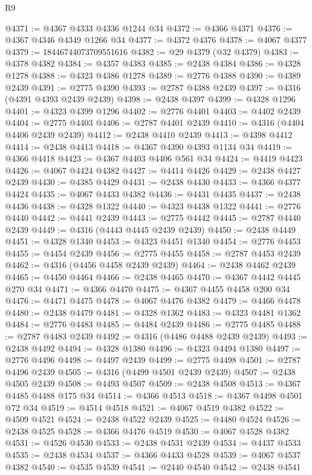 \begin{lexlean}{R9}
\begin{coremodule}
@4371 := @4367 @4333 @4336 @1244 @34
@4372 := @4366 @4371
@4376 := @4367 @4346 @4349 @1266 @34
@4377 := @4372 @4376
@4378 := @4067 @4377
@4379 := 18446744073709551616
@4382 := @29 @4379 (@32 @4379)
@4383 := @4378 @4382
@4384 := @4357 @4383
@4385 := @2438 @4384
@4386 := @4328 @1278
@4388 := @4323 @4386 @1278
@4389 := @2776 @4388
@4390 := @4389 @2439
@4391 := @2775 @4390
@4393 := @2787 @4388 @2439
@4397 := @4316 (@4391 @4393 @2439 @2439)
@4398 := @2438 @4397
@4399 := @4328 @1296
@4401 := @4323 @4399 @1296
@4402 := @2776 @4401
@4403 := @4402 @2439
@4404 := @2775 @4403
@4406 := @2787 @4401 @2439
@4410 := @4316 (@4404 @4406 @2439 @2439)
@4412 := @2438 @4410 @2439
@4413 := @4398 @4412
@4414 := @2438 @4413
@4418 := @4367 @4390 @4393 @1134 @34
@4419 := @4366 @4418
@4423 := @4367 @4403 @4406 @561 @34
@4424 := @4419 @4423
@4426 := @4067 @4424 @4382
@4427 := @4414 @4426
@4429 := @2438 @4427 @2439
@4430 := @4385 @4429
@4431 := @2438 @4430
@4433 := @4366 @4377 @4424
@4435 := @4067 @4433 @4382
@4436 := @4431 @4435
@4437 := @2438 @4436
@4438 := @4328 @1322
@4440 := @4323 @4438 @1322
@4441 := @2776 @4440
@4442 := @4441 @2439
@4443 := @2775 @4442
@4445 := @2787 @4440 @2439
@4449 := @4316 (@4443 @4445 @2439 @2439)
@4450 := @2438 @4449
@4451 := @4328 @1340
@4453 := @4323 @4451 @1340
@4454 := @2776 @4453
@4455 := @4454 @2439
@4456 := @2775 @4455
@4458 := @2787 @4453 @2439
@4462 := @4316 (@4456 @4458 @2439 @2439)
@4464 := @2438 @4462 @2439
@4465 := @4450 @4464
@4466 := @2438 @4465
@4470 := @4367 @4442 @4445 @270 @34
@4471 := @4366 @4470
@4475 := @4367 @4455 @4458 @200 @34
@4476 := @4471 @4475
@4478 := @4067 @4476 @4382
@4479 := @4466 @4478
@4480 := @2438 @4479
@4481 := @4328 @1362
@4483 := @4323 @4481 @1362
@4484 := @2776 @4483
@4485 := @4484 @2439
@4486 := @2775 @4485
@4488 := @2787 @4483 @2439
@4492 := @4316 (@4486 @4488 @2439 @2439)
@4493 := @2438 @4492
@4494 := @4328 @1380
@4496 := @4323 @4494 @1380
@4497 := @2776 @4496
@4498 := @4497 @2439
@4499 := @2775 @4498
@4501 := @2787 @4496 @2439
@4505 := @4316 (@4499 @4501 @2439 @2439)
@4507 := @2438 @4505 @2439
@4508 := @4493 @4507
@4509 := @2438 @4508
@4513 := @4367 @4485 @4488 @175 @34
@4514 := @4366 @4513
@4518 := @4367 @4498 @4501 @72 @34
@4519 := @4514 @4518
@4521 := @4067 @4519 @4382
@4522 := @4509 @4521
@4524 := @2438 @4522 @2439
@4525 := @4480 @4524
@4526 := @2438 @4525
@4528 := @4366 @4476 @4519
@4530 := @4067 @4528 @4382
@4531 := @4526 @4530
@4533 := @2438 @4531 @2439
@4534 := @4437 @4533
@4535 := @2438 @4534
@4537 := @4366 @4433 @4528
@4539 := @4067 @4537 @4382
@4540 := @4535 @4539
@4541 := @2440 @4540
@4542 := @2438 @4541

\end{coremodule}
\end{lexlean}
